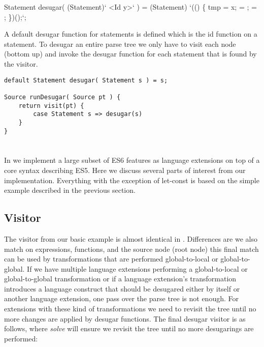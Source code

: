 
\begin{rascal}
Statement desugar( (Statement)`   {\textless{}Id y\textgreater{}}` )
    = (Statement)
            `(() \{{}
            	 tmp = x;
            	 = ;
            	 = ;
            \}{})();`;
\end{rascal}

A default desugar function for statements is defined which is the id function on a statement. To desugar an entire parse tree we only have to visit each node (bottom up) and invoke the desugar function for each statement that is found by the visitor.

\begin{lstlisting}[caption=Desugar visitor, language=rascal]
default Statement desugar( Statement s ) = s;

Source runDesugar( Source pt ) {
	return visit(pt) {
		case Statement s => desugar(s)
	}
}
\end{lstlisting}

\section{\projectname}
In \textit{\projectname} we implement a large subset of ES6 features as language extensions on top of a core syntax describing ES5. Here we discuss several parts of interest from our implementation. Everything with the exception of let-const is based on the simple example described in the previous section. 

\subsection{Visitor}
The visitor from our basic example is almost identical in \projectname. Differences are we also match on expressions, functions, and the source node (root node) this final match can be used by transformations that are performed global-to-local or global-to-global. If we have multiple language extensions performing a global-to-local or global-to-global transformation or if a language extension's transformation introduces a language construct that should be desugared either by itself or another language extension, one pass over the parse tree is not enough. For extensions with these kind of transformations we need to revisit the tree until no more changes are applied by desugar functions. The final desugar visitor is as follows, where \textit{solve} will ensure we revisit the tree until no more desugarings are performed:

